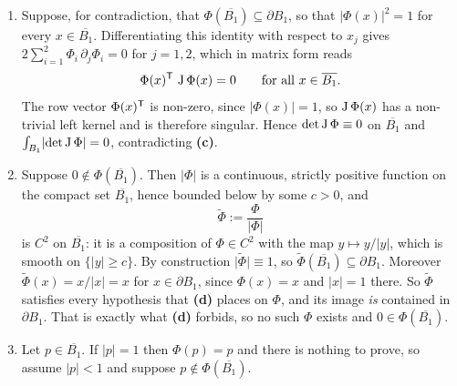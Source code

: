 \begin{exercisesolution}
\begin{enumerate}[label=\textbf{(\alph*)}]
  \item Suppose, for contradiction, that $\Phi(\overline{B_1}) \subseteq \partial B_1$, so that
    $\lvert\Phi(x)\rvert^2 = 1$ for every $x \in \overline{B_1}$. Differentiating this identity
    with respect to $x_j$ gives $2\sum_{i=1}^2 \Phi_i\,\partial_j\Phi_i = 0$ for $j = 1,2$, which
    in matrix form reads
    \[\Phi(x)^{\mathsf{T}}\, \operatorname{J}\Phi(x) = 0 \qquad\text{for all } x \in \overline{B_1}.\]
    The row vector $\Phi(x)^{\mathsf{T}}$ is non-zero, since $\lvert\Phi(x)\rvert = 1$, so
    $\operatorname{J}\Phi(x)$ has a non-trivial left kernel and is therefore singular. Hence
    $\det\operatorname{J}\Phi \equiv 0$ on $\overline{B_1}$ and $\int_{B_1}\lvert\det\operatorname{J}\Phi\rvert = 0$,
    contradicting \textbf{(c)}.

  \item Suppose $0 \notin \Phi(\overline{B_1})$. Then $\lvert\Phi\rvert$ is a continuous, strictly
    positive function on the compact set $\overline{B_1}$, hence bounded below by some $c > 0$, and
    \[\widetilde\Phi := \frac{\Phi}{\lvert\Phi\rvert}\]
    is $C^2$ on $\overline{B_1}$: it is a composition of $\Phi \in C^2$ with the map
    $y \mapsto y/\lvert y\rvert$, which is smooth on $\{\lvert y\rvert \geq c\}$. By construction
    $\lvert\widetilde\Phi\rvert \equiv 1$, so $\widetilde\Phi(\overline{B_1}) \subseteq \partial
    B_1$. Moreover $\widetilde\Phi(x) = x/\lvert x\rvert = x$ for $x \in \partial B_1$, since
    $\Phi(x) = x$ and $\lvert x\rvert = 1$ there. So $\widetilde\Phi$ satisfies every hypothesis
    that \textbf{(d)} places on $\Phi$, and its image \emph{is} contained in $\partial B_1$. That
    is exactly what \textbf{(d)} forbids, so no such $\Phi$ exists and $0 \in \Phi(\overline{B_1})$.

  \item Let $p \in \overline{B_1}$. If $\lvert p\rvert = 1$ then $\Phi(p) = p$ and there is nothing
    to prove, so assume $\lvert p\rvert < 1$ and suppose $p \notin \Phi(\overline{B_1})$.


\end{enumerate}
\end{exercisesolution}
